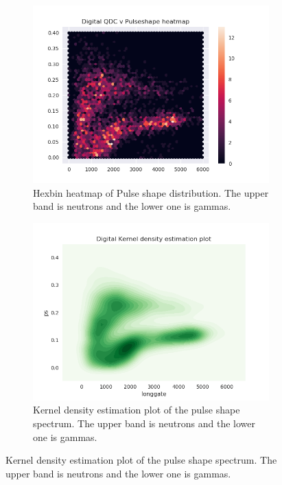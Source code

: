 \documentclass[main.tex]{subfiles}
\begin{document}
\begin{figure}
    \centering
    \begin{subfigure}[b]{0.9\textwidth}
        \includegraphics[width=\textwidth]{DigitalResults/psd_hexbin.png}
        \caption{Hexbin heatmap of Pulse shape distribution. The upper band is neutrons and the lower one is gammas.}
        \label{fig:hex_a}
    \end{subfigure}
    \begin{subfigure}[b]{0.9\textwidth}
        \includegraphics[width=\textwidth]{DigitalResults/psd_kde.png}
        \caption{Kernel density estimation plot of the pulse shape spectrum. The upper band is neutrons and the lower one is gammas.}
        \label{fig:kde_a}
    \end{subfigure}
\label{fig:animals}
\end{figure}
\end{document}
